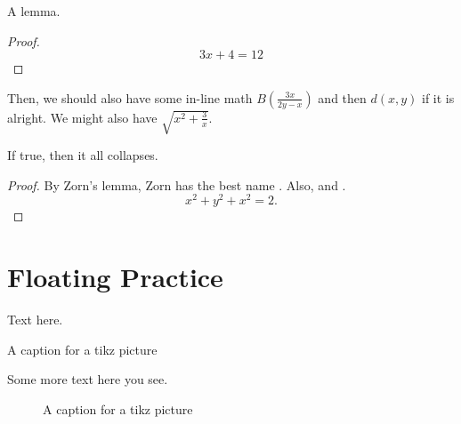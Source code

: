 \begin{lemma}
  A lemma.
\end{lemma}
\begin{proof}
  \[3x+4=12\]
\end{proof}

Then, we should also have some in-line math $B\left(\frac{3x}{2y-x}\right)$ and then $d(x,y)$ if it is alright. We might also have $\sqrt{x^2+\frac{3}{x}}$.

\begin{theorem}
  If true, then it all collapses.
  \label{WhatAGreatTheorem}
\end{theorem}
\begin{proof}
  By Zorn's lemma, Zorn has the best name \autocite{martiniCompleteReducedConvex2019}.
  Also, \autocite{chenGraphHomotopyGraham2001} and \autocite{dochtermannMinimalGraphsContractible2023}.
  \[x^2+y^2+x^2=2.\]

\end{proof}
\section{Floating Practice}
Text here.


\begin{center}
  \captionsetup{type=figure}%
  \caption{A caption for a tikz picture}
\end{center}
Some more text here you see.
\begin{figure}[tb]
  \caption{A caption for a tikz picture}
\end{figure}

